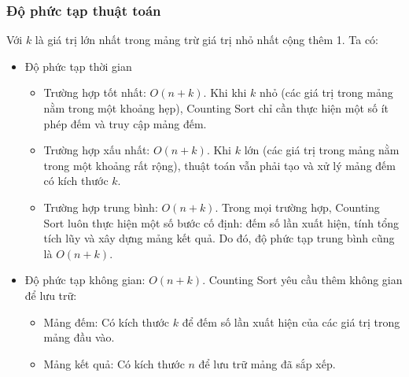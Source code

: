 \begin{center}
\end{center}

\subsubsection{Độ phức tạp thuật toán}

Với $k$ là giá trị lớn nhất trong mảng trừ giá trị nhỏ nhất cộng thêm 1. Ta có:

\begin{itemize}
	\item Độ phức tạp thời gian \cite[p.~209]{cormen2022}
	\begin{itemize}[label=$\circ$]
		\item Trường hợp tốt nhất: $O\left(n+k\right)$. Khi khi $k$ nhỏ 
		(các giá trị trong mảng nằm trong một khoảng hẹp), Counting Sort 
		chỉ cần thực hiện một số ít phép đếm và truy cập mảng đếm.
		\item Trường hợp xấu nhất: $O\left(n+k\right)$. Khi $k$ lớn (các 
		giá trị trong mảng nằm trong một khoảng rất rộng), thuật toán 
		vẫn phải tạo và xử lý mảng đếm có kích thước $k$.
		\item Trường hợp trung bình: $O\left(n+k\right)$. Trong mọi 
		trường hợp, Counting Sort luôn thực hiện một số bước cố định: 
		đếm số lần xuất hiện, tính tổng tích lũy và xây dựng mảng kết quả. 
		Do đó, độ phức tạp trung bình cũng là $O\left(n+k\right)$. 
	\end{itemize}
	\item Độ phức tạp không gian: $O\left(n+k\right)$. Counting Sort 
	yêu cầu thêm không gian để lưu trữ:
	\begin{itemize}[label=$\circ$]
		\item Mảng đếm: Có kích thước $k$ để đếm số lần xuất hiện của 
		các giá trị trong mảng đầu vào.
		\item Mảng kết quả: Có kích thước $n$ để lưu trữ mảng đã sắp xếp.
	\end{itemize}
\end{itemize}